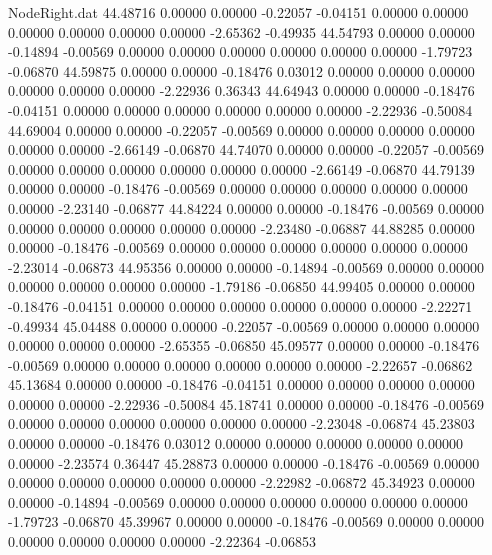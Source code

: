 \begin{filecontents}{NodeRight.dat}
  44.48716    0.00000    0.00000    -0.22057   -0.04151    0.00000    0.00000    0.00000    0.00000    0.00000    0.00000   -2.65362   -0.49935
  44.54793    0.00000    0.00000    -0.14894   -0.00569    0.00000    0.00000    0.00000    0.00000    0.00000    0.00000   -1.79723   -0.06870
  44.59875    0.00000    0.00000    -0.18476    0.03012    0.00000    0.00000    0.00000    0.00000    0.00000    0.00000   -2.22936    0.36343
  44.64943    0.00000    0.00000    -0.18476   -0.04151    0.00000    0.00000    0.00000    0.00000    0.00000    0.00000   -2.22936   -0.50084
  44.69004    0.00000    0.00000    -0.22057   -0.00569    0.00000    0.00000    0.00000    0.00000    0.00000    0.00000   -2.66149   -0.06870
  44.74070    0.00000    0.00000    -0.22057   -0.00569    0.00000    0.00000    0.00000    0.00000    0.00000    0.00000   -2.66149   -0.06870
  44.79139    0.00000    0.00000    -0.18476   -0.00569    0.00000    0.00000    0.00000    0.00000    0.00000    0.00000   -2.23140   -0.06877
  44.84224    0.00000    0.00000    -0.18476   -0.00569    0.00000    0.00000    0.00000    0.00000    0.00000    0.00000   -2.23480   -0.06887
  44.88285    0.00000    0.00000    -0.18476   -0.00569    0.00000    0.00000    0.00000    0.00000    0.00000    0.00000   -2.23014   -0.06873
  44.95356    0.00000    0.00000    -0.14894   -0.00569    0.00000    0.00000    0.00000    0.00000    0.00000    0.00000   -1.79186   -0.06850
  44.99405    0.00000    0.00000    -0.18476   -0.04151    0.00000    0.00000    0.00000    0.00000    0.00000    0.00000   -2.22271   -0.49934
  45.04488    0.00000    0.00000    -0.22057   -0.00569    0.00000    0.00000    0.00000    0.00000    0.00000    0.00000   -2.65355   -0.06850
  45.09577    0.00000    0.00000    -0.18476   -0.00569    0.00000    0.00000    0.00000    0.00000    0.00000    0.00000   -2.22657   -0.06862
  45.13684    0.00000    0.00000    -0.18476   -0.04151    0.00000    0.00000    0.00000    0.00000    0.00000    0.00000   -2.22936   -0.50084
  45.18741    0.00000    0.00000    -0.18476   -0.00569    0.00000    0.00000    0.00000    0.00000    0.00000    0.00000   -2.23048   -0.06874
  45.23803    0.00000    0.00000    -0.18476    0.03012    0.00000    0.00000    0.00000    0.00000    0.00000    0.00000   -2.23574    0.36447
  45.28873    0.00000    0.00000    -0.18476   -0.00569    0.00000    0.00000    0.00000    0.00000    0.00000    0.00000   -2.22982   -0.06872
  45.34923    0.00000    0.00000    -0.14894   -0.00569    0.00000    0.00000    0.00000    0.00000    0.00000    0.00000   -1.79723   -0.06870
  45.39967    0.00000    0.00000    -0.18476   -0.00569    0.00000    0.00000    0.00000    0.00000    0.00000    0.00000   -2.22364   -0.06853

\end{filecontents}
